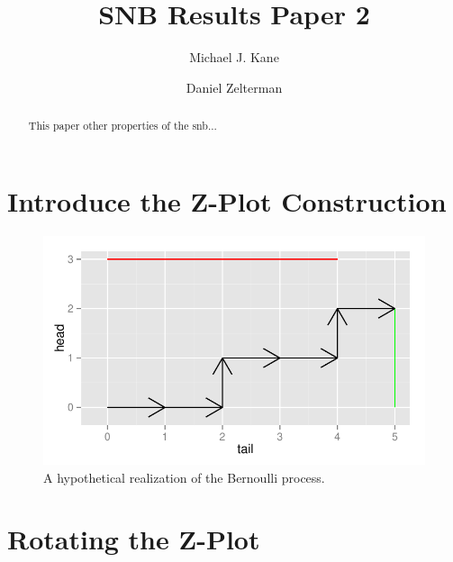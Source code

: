 \documentclass{article}
\begin{document}
\title{SNB Results Paper 2}

\author[1]{Michael J. Kane}
\author[1]{Daniel Zelterman}


\maketitle

\begin{abstract}
This paper other properties of the snb...
\end{abstract}

\section{Introduce the Z-Plot Construction}

\begin{figure}[ht]
\includegraphics[width=\textwidth]{z-plot1.pdf}
\caption{
A hypothetical realization of the Bernoulli process.
}
\label{fig:z_plot}
\end{figure}

\section{Rotating the Z-Plot}




\end{document}
